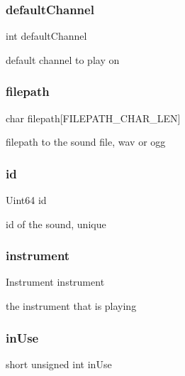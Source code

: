 \subsubsection{\texorpdfstring{default\+Channel}{defaultChannel}}
{\footnotesize\ttfamily int default\+Channel}

default channel to play on \mbox{\label{structsound__s_aa860b866620309ee03358dbb835ca4d7}} 
\subsubsection{\texorpdfstring{filepath}{filepath}}
{\footnotesize\ttfamily char filepath\mbox{[}F\+I\+L\+E\+P\+A\+T\+H\+\_\+\+C\+H\+A\+R\+\_\+\+L\+EN\mbox{]}}

filepath to the sound file, wav or ogg \mbox{\label{structsound__s_a4158e9a3af9337e59f9b8de984c0efba}} 
\subsubsection{\texorpdfstring{id}{id}}
{\footnotesize\ttfamily Uint64 id}

id of the sound, unique \mbox{\label{structsound__s_a88fb6e4086e01e476912df234d0f9d20}} 
\subsubsection{\texorpdfstring{instrument}{instrument}}
{\footnotesize\ttfamily Instrument instrument}

the instrument that is playing \mbox{\label{structsound__s_a13159f6b47122dc47eb11b1653a1663a}} 
\subsubsection{\texorpdfstring{in\+Use}{inUse}}
{\footnotesize\ttfamily short unsigned int in\+Use}

